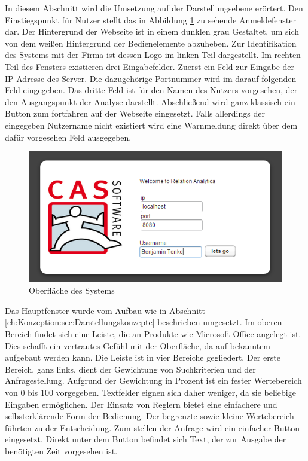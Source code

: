 In diesem Abschnitt wird die Umsetzung auf der Darstellungsebene erörtert. Den Einstiegspunkt für Nutzer stellt das in Abbildung \ref{ergebniss_oberflaeche_anmeld} zu sehende Anmeldefenster dar. Der Hintergrund der Webseite ist in einem dunklen grau Gestaltet, um sich von dem weißen Hintergrund der Bedienelemente abzuheben. Zur Identifikation des Systems mit der Firma ist dessen Logo im linken Teil dargestellt. Im rechten Teil des Fensters existieren drei Eingabefelder. Zuerst ein Feld zur Eingabe der IP-Adresse des Server. Die dazugehörige Portnummer wird im darauf folgenden Feld eingegeben. Das dritte Feld ist für den Namen des Nutzers vorgesehen, der den Ausgangspunkt der Analyse darstellt. Abschließend wird ganz klassisch ein Button zum fortfahren auf der Webseite eingesetzt. Falls allerdings der eingegeben Nutzername nicht existiert wird eine Warnmeldung direkt über dem dafür vorgesehen Feld ausgegeben. 

\begin{figure}[htbp]
\centering
\includegraphics[scale=2.0]{pics/login.png}
\caption{Oberfläche des Systems}
\label{ergebniss_oberflaeche_anmeld}
\end{figure}

Das Hauptfenster wurde vom Aufbau wie in Abschnitt \ref{ch:Konzeption:sec:Darstellungskonzepte} beschrieben umgesetzt. Im oberen Bereich findet sich eine Leiste, die an Produkte wie Microsoft Office angelegt ist. Dies schafft ein vertrautes Gefühl mit der Oberfläche, da auf bekanntem aufgebaut werden kann. Die Leiste ist in vier Bereiche gegliedert. Der erste Bereich, ganz links, dient der Gewichtung von Suchkriterien und der Anfragestellung. Aufgrund der Gewichtung in Prozent ist ein fester Wertebereich von 0 bis 100 vorgegeben. Textfelder eignen sich daher weniger, da sie beliebige Eingaben ermöglichen. Der Einsatz von Reglern bietet eine einfachere und selbsterklärende Form der Bedienung. Der begrenzte sowie kleine Wertebereich führten zu der Entscheidung. Zum stellen der Anfrage wird ein einfacher Button eingesetzt. Direkt unter dem Button befindet sich Text, der zur Ausgabe der benötigten Zeit vorgesehen ist. 

